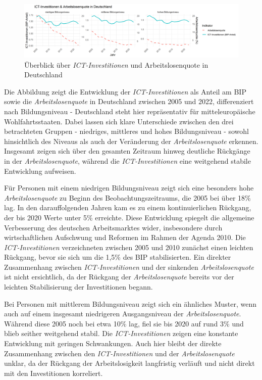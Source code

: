 \begin{figure}[htbp]
    \centering
    \includegraphics[width=\textwidth]{assets/plot_germany_final.png}
    \caption{Überblick über \textit{\ac{ICT}-Investitionen} und Arbeitslosenquote in 
    Deutschland}
    \label{fig:germany}
\end{figure}

Die Abbildung zeigt die Entwicklung der \textit{\ac{ICT}-Investitionen} als Anteil 
am BIP sowie die \textit{Arbeitslosenquote} in Deutschland zwischen 2005 und 2022, 
differenziert nach Bildungsniveau - Deutschland steht hier repräsentativ für 
mitteleuropäische Wohlfahrtsstaaten. Dabei lassen sich klare Unterschiede zwischen 
den drei betrachteten Gruppen - niedriges, mittleres und hohes Bildungsniveau - sowohl 
hinsichtlich des Niveaus als auch der Veränderung der \textit{Arbeitslosenquote} 
erkennen. Insgesamt zeigen sich über den gesamten Zeitraum hinweg deutliche Rückgänge 
in der \textit{Arbeitslosenquote}, während die \textit{\ac{ICT}-Investitionen} eine 
weitgehend stabile Entwicklung aufweisen.

Für Personen mit einem niedrigen Bildungsniveau zeigt sich eine besonders hohe 
\textit{Arbeitslosenquote} zu Beginn des Beobachtungszeitraums, die 2005 bei über 
18\% lag. In den darauffolgenden Jahren kam es zu einem kontinuierlichen Rückgang, 
der bis 2020 Werte unter 5\% erreichte. Diese Entwicklung spiegelt die allgemeine 
Verbesserung des deutschen Arbeitsmarktes wider, insbesondere durch wirtschaftlichen 
Aufschwung und Reformen im Rahmen der Agenda 2010. Die \textit{\ac{ICT}-Investitionen} 
verzeichneten zwischen 2005 und 2010 zunächst einen leichten Rückgang, bevor sie sich 
um die 1,5\% des BIP stabilisierten. Ein direkter Zusammenhang zwischen 
\textit{\ac{ICT}-Investitionen} und der sinkenden \textit{Arbeitslosenquote} ist 
nicht ersichtlich, da der Rückgang der \textit{Arbeitslosenquote} bereits vor der 
leichten Stabilisierung der Investitionen begann.

Bei Personen mit mittlerem Bildungsniveau zeigt sich ein ähnliches Muster, wenn auch 
auf einem insgesamt niedrigeren Ausgangsniveau der \textit{Arbeitslosenquote}. Während 
diese 2005 noch bei etwa 10\% lag, fiel sie bis 2020 auf rund 3\% und blieb seither 
weitgehend stabil. Die \textit{\ac{ICT}-Investitionen} zeigen eine konstante 
Entwicklung mit geringen Schwankungen. Auch hier bleibt der direkte Zusammenhang 
zwischen den \textit{\ac{ICT}-Investitionen} und der \textit{Arbeitslosenquote} unklar, 
da der Rückgang der Arbeitslosigkeit langfristig verläuft und nicht direkt mit den 
Investitionen korreliert.

